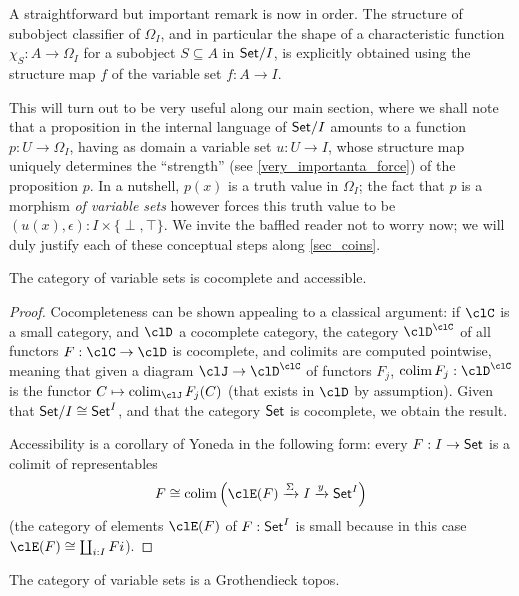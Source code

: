 \begin{remark}
  A straightforward but important remark is now in order. The structure of subobject classifier of $\Omega_I$, and in particular the shape of a characteristic function $\chi_S : A \to \Omega_I$ for a subobject $S\subseteq A$ in $\mathsf{Set}/I$, is explicitly obtained using the structure map $f$ of the variable set $f : A\to I$.

  This will turn out to be very useful along our main section, where we shall note that a proposition in the internal language of $\mathsf{Set}/I$ amounts to a function $p : U \to \Omega_I$, having as domain a variable set $u : U \to I$, whose structure map uniquely determines the ``strength'' (see \autoref{very_importanta_force}) of the proposition $p$. In a nutshell, $p(x)$ is a truth value in $\Omega_I$; the fact that $p$ is a morphism \emph{of variable sets} however forces this truth value to be $(u(x),\epsilon) : I\times \{\perp,\top\}$. We invite the baffled reader not to worry now; we will duly justify each of these conceptual steps along \autoref{sec_coins}.
\end{remark}
\begin{proposition}
  The category of variable sets is cocomplete and accessible.
\end{proposition}
\begin{proof}
  Cocompleteness can be shown appealing to a classical argument: if $\clC$ is a small category, and $\clD$ a cocomplete category, the category $\clD^\clC$ of all functors $F : \clC \to \clD$ is cocomplete, and colimits are computed pointwise, meaning that given a diagram $\clJ \to \clD^\clC$ of functors $F_j$, $\colim F_j : \clD^\clC$ is the functor $C \mapsto \colim_\clJ F_j(C)$ (that exists in $\clD$ by assumption).
  Given that $\mathsf{Set}/I\cong \mathsf{Set}^I$, and that the category $\mathsf{Set}$ is cocomplete, we obtain the result.

  Accessibility is a corollary of Yoneda in the following form: every $F : I \to \mathsf{Set}$ is a colimit of representables
  \[
    F \cong \colim\Big(\clE(F) \xto{\Sigma} I \xto{y} \Set^I\Big)
  \]
  (the category of elements \cite{Bor1} $\clE(F)$ of $F:\mathsf{Set}^I$ is small because in this case $\clE(F)\cong\coprod_{i: I}Fi$).
\end{proof}
\begin{corollary}
  The category of variable sets is a Grothendieck topos.
\end{corollary}
